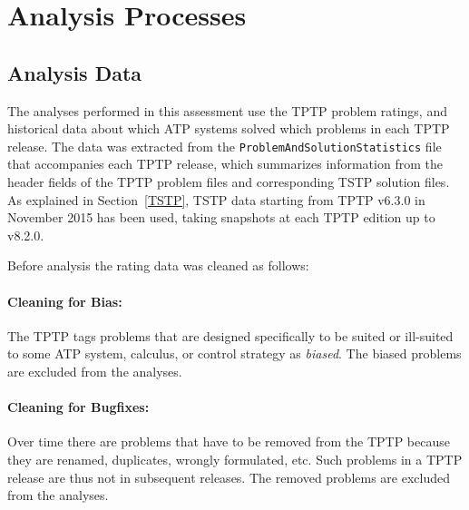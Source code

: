 \documentclass[runningheads]{llncs}
\begin{document}
\section{Analysis Processes}
\label{AnalysisProcesses}

\subsection{Analysis Data}
\label{AnalysisData}

The analyses performed in this assessment use the TPTP problem ratings, and historical data about 
which ATP systems solved which problems in each TPTP release.
The data was extracted from the {\tt ProblemAndSolutionStatistics} file that accompanies each TPTP 
release, which summarizes information from the header fields of the TPTP problem files and
corresponding TSTP solution files.
As explained in Section~\ref{TSTP}, TSTP data starting from TPTP v6.3.0 in November 2015 has been
used, taking snapshots at each TPTP edition up to v8.2.0.

Before analysis the rating data was cleaned as follows:

\vspace*{-0.5em}
\paragraph{Cleaning for Bias:}
The TPTP tags problems that are designed specifically to be suited or ill-suited to some ATP 
system, calculus, or control strategy as {\em biased}. 
The biased problems are excluded from the analyses.

\vspace*{-0.5em}
\paragraph{Cleaning for Bugfixes:}
Over time there are problems that have to be removed from the TPTP because they are renamed,
duplicates, wrongly formulated, etc.
Such problems in a TPTP release are thus not in subsequent releases.
The removed problems are excluded from the analyses.

\vspace*{-0.5em}
\end{document}
